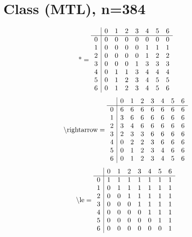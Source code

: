 \documentclass[11pt]{article}
\begin{document}
\section{Class (MTL), n=384}
\[\text{*} = 
\begin{array}{r | r r r r r r r}
 & 0 & 1 & 2 & 3 & 4 & 5 & 6 \\ \hline
0 & 0 & 0 & 0 & 0 & 0 & 0 & 0 \\
1 & 0 & 0 & 0 & 0 & 1 & 1 & 1 \\
2 & 0 & 0 & 0 & 0 & 1 & 2 & 2 \\
3 & 0 & 0 & 0 & 1 & 3 & 3 & 3 \\
4 & 0 & 1 & 1 & 3 & 4 & 4 & 4 \\
5 & 0 & 1 & 2 & 3 & 4 & 5 & 5 \\
6 & 0 & 1 & 2 & 3 & 4 & 5 & 6 \\
\end{array}
\]
\[\text{\textbackslash rightarrow} = 
\begin{array}{r | r r r r r r r}
 & 0 & 1 & 2 & 3 & 4 & 5 & 6 \\ \hline
0 & 6 & 6 & 6 & 6 & 6 & 6 & 6 \\
1 & 3 & 6 & 6 & 6 & 6 & 6 & 6 \\
2 & 3 & 4 & 6 & 6 & 6 & 6 & 6 \\
3 & 2 & 3 & 3 & 6 & 6 & 6 & 6 \\
4 & 0 & 2 & 2 & 3 & 6 & 6 & 6 \\
5 & 0 & 1 & 2 & 3 & 4 & 6 & 6 \\
6 & 0 & 1 & 2 & 3 & 4 & 5 & 6 \\
\end{array}
\]
\[\text{\textbackslash le} = 
\begin{array}{r | r r r r r r r}
 & 0 & 1 & 2 & 3 & 4 & 5 & 6 \\ \hline
0 & 1 & 1 & 1 & 1 & 1 & 1 & 1 \\
1 & 0 & 1 & 1 & 1 & 1 & 1 & 1 \\
2 & 0 & 0 & 1 & 1 & 1 & 1 & 1 \\
3 & 0 & 0 & 0 & 1 & 1 & 1 & 1 \\
4 & 0 & 0 & 0 & 0 & 1 & 1 & 1 \\
5 & 0 & 0 & 0 & 0 & 0 & 1 & 1 \\
6 & 0 & 0 & 0 & 0 & 0 & 0 & 1 \\
\end{array}
\]
\end{document}
